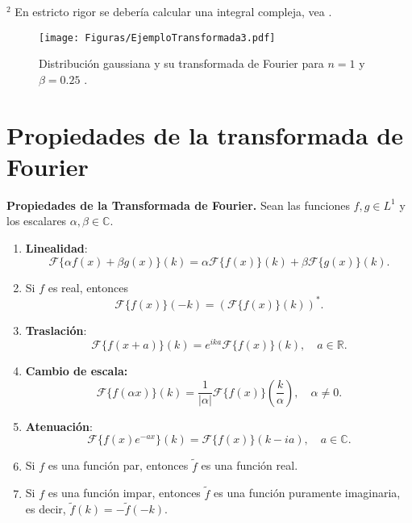 \begin{ejemplo}
        {\footnotesize
        $^2$ En estricto rigor se debería calcular una integral compleja, vea \cite{Arfken}.
        }



    \begin{figure}[H]
        \centering
        \texttt{[image: Figuras/EjemploTransformada3.pdf]}
        \caption{Distribución gaussiana y su transformada de Fourier para $n=1$ y $\beta =0.25$ .}
        \label{Espectro4}
    \end{figure}
\end{ejemplo}


\section{Propiedades de la transformada de Fourier}

\begin{propiedad} 
\textbf{Propiedades de la Transformada de Fourier.} Sean las funciones $f, g \in L^1$ y los escalares $\alpha, \beta \in \mathbb{C}$.

\begin{enumerate}
    \item \textbf{Linealidad}: $$\mathcal{F}\{\alpha f(x) + \beta g(x)\}(k) = \alpha \mathcal{F}\{f(x)\}(k) + \beta \mathcal{F}\{g(x)\}(k).$$ 
    
    \item Si $f$ es real, entonces 
    $$ \mathcal{F}\{f(x)\}(-k) = (\mathcal{F}\{f(x)\}(k))^*.$$
    
    \item \textbf{Traslación}: $$\mathcal{F}\{f(x+a)\}(k) = e^{ika} \mathcal{F}\{f(x)\}(k), \quad a \in \mathbb{R}.$$
    
    \item \textbf{Cambio de escala:} $$\mathcal{F}\{f(\alpha x)\}(k) = \frac{1}{|\alpha|}\mathcal{F}\{f(x)\}\left(\frac{k}{ \alpha}\right), \quad\alpha \neq 0.$$
    
    \item  \textbf{Atenuación}: $$\mathcal{F}\{f(x)e^{-ax}\}(k) =  \mathcal{F}\{f(x)\}(k-ia), \quad a \in \mathbb{C}.$$
    
    \item Si $f$ es una función par, entonces $\tilde{f}$ es una función real.
    
    \item Si $f$ es una función impar, entonces $\tilde{f}$ es una función puramente imaginaria, es decir, $\tilde{f}(k) = - \tilde{f}(-k)$.

\end{enumerate}
\end{propiedad}

